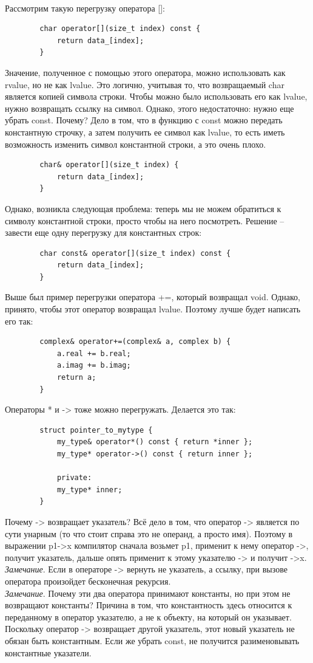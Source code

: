 \documentclass[12pt, a4paper]{article}
\begin{document}
	\\\par Рассмотрим такую перегрузку оператора []:
	\begin{verbatim}
		char operator[](size_t index) const {
			return data_[index];
		}
	\end{verbatim}
	Значение, полученное с помощью этого оператора, можно использовать как rvalue, но не как lvalue. Это логично, учитывая то, что возвращаемый char является копией символа строки. Чтобы можно было использовать его как lvalue, нужно возвращать ссылку на символ. Однако, этого недостаточно: нужно еще убрать const. Почему? Дело в том, что в функцию с const можно передать константную строчку, а затем получить ее символ как lvalue, то есть иметь возможность изменить символ константной строки, а это очень плохо.
	\begin{verbatim}
		char& operator[](size_t index) {
			return data_[index];
		}
	\end{verbatim}
	Однако, возникла следующая проблема: теперь мы не можем обратиться к символу константной строки, просто чтобы на него посмотреть. Решение -- завести еще одну перегрузку для константных строк:
	\begin{verbatim}
		char const& operator[](size_t index) const {
			return data_[index];
		}
	\end{verbatim}
	\par Выше был пример перегрузки оператора +=, который возвращал void. Однако, принято, чтобы этот оператор возвращал lvalue. Поэтому лучше будет написать его так: 
	\begin{verbatim}
		complex& operator+=(complex& a, complex b) {
			a.real += b.real;
			a.imag += b.imag;
			return a;
		}
	\end{verbatim}
	\par Операторы * и -> тоже можно перегружать. Делается это так:
	\begin{verbatim}
		struct pointer_to_mytype {
			my_type& operator*() const { return *inner };
			my_type* operator->() const { return inner };
			
			private:
			my_type* inner;
		}
	\end{verbatim}
	Почему -> возвращает указатель? Всё дело в том, что оператор -> является по сути унарным (то что стоит справа это не операнд, а просто имя). Поэтому в выражении p1->x компилятор сначала возьмет p1, применит к нему оператор ->, получит указатель, дальше опять применит к этому указателю -> и получит ->x.\\
	\textit{Замечание}. Если в операторе -> вернуть не указатель, а ссылку, при вызове оператора произойдет бесконечная рекурсия.\\
	\textit{Замечание}. Почему эти два оператора принимают константы, но при этом не возвращают константы? Причина в том, что константность здесь относится к переданному в оператор указателю, а не к объекту, на который он указывает. Поскольку оператор -> возвращает другой указатель, этот новый указатель не обязан быть константным. Если же убрать const, не получится разименовывать константные указатели.
\end{document}
